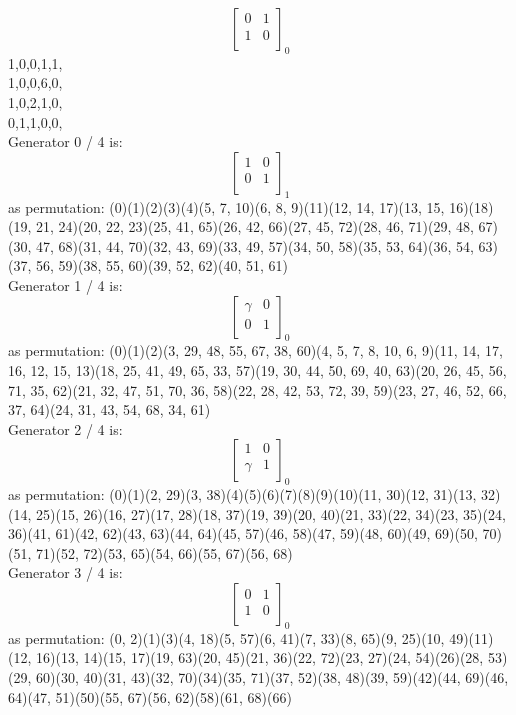 $$
\left[
\begin{array}{*{2}{r}}
0 & 1\\
1 & 0\\
\end{array}
\right]
_{0}
$$
1,0,0,1,1,\\
1,0,0,6,0,\\
1,0,2,1,0,\\
0,1,1,0,0,\\
Generator 0 / 4 is:
$$
\left[
\begin{array}{*{2}{r}}
1 & 0\\
0 & 1\\
\end{array}
\right]
_{1}
$$
as permutation:
(0)(1)(2)(3)(4)(5, 7, 10)(6, 8, 9)(11)(12, 14, 17)(13, 15, 16)(18)(19, 21, 24)(20, 22, 23)(25, 41, 65)(26, 42, 66)(27, 45, 72)(28, 46, 71)(29, 48, 67)(30, 47, 68)(31, 44, 70)(32, 43, 69)(33, 49, 57)(34, 50, 58)(35, 53, 64)(36, 54, 63)(37, 56, 59)(38, 55, 60)(39, 52, 62)(40, 51, 61)\\
Generator 1 / 4 is:
$$
\left[
\begin{array}{*{2}{r}}
\gamma  & 0\\
0 & 1\\
\end{array}
\right]
_{0}
$$
as permutation:
(0)(1)(2)(3, 29, 48, 55, 67, 38, 60)(4, 5, 7, 8, 10, 6, 9)(11, 14, 17, 16, 12, 15, 13)(18, 25, 41, 49, 65, 33, 57)(19, 30, 44, 50, 69, 40, 63)(20, 26, 45, 56, 71, 35, 62)(21, 32, 47, 51, 70, 36, 58)(22, 28, 42, 53, 72, 39, 59)(23, 27, 46, 52, 66, 37, 64)(24, 31, 43, 54, 68, 34, 61)\\
Generator 2 / 4 is:
$$
\left[
\begin{array}{*{2}{r}}
1 & 0\\
\gamma  & 1\\
\end{array}
\right]
_{0}
$$
as permutation:
(0)(1)(2, 29)(3, 38)(4)(5)(6)(7)(8)(9)(10)(11, 30)(12, 31)(13, 32)(14, 25)(15, 26)(16, 27)(17, 28)(18, 37)(19, 39)(20, 40)(21, 33)(22, 34)(23, 35)(24, 36)(41, 61)(42, 62)(43, 63)(44, 64)(45, 57)(46, 58)(47, 59)(48, 60)(49, 69)(50, 70)(51, 71)(52, 72)(53, 65)(54, 66)(55, 67)(56, 68)\\
Generator 3 / 4 is:
$$
\left[
\begin{array}{*{2}{r}}
0 & 1\\
1 & 0\\
\end{array}
\right]
_{0}
$$
as permutation:
(0, 2)(1)(3)(4, 18)(5, 57)(6, 41)(7, 33)(8, 65)(9, 25)(10, 49)(11)(12, 16)(13, 14)(15, 17)(19, 63)(20, 45)(21, 36)(22, 72)(23, 27)(24, 54)(26)(28, 53)(29, 60)(30, 40)(31, 43)(32, 70)(34)(35, 71)(37, 52)(38, 48)(39, 59)(42)(44, 69)(46, 64)(47, 51)(50)(55, 67)(56, 62)(58)(61, 68)(66)\\
